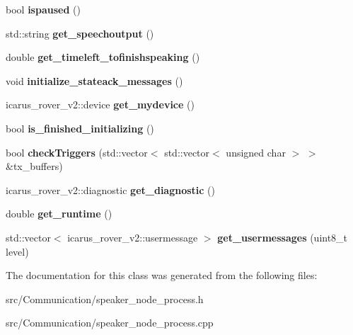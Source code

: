 \begin{DoxyCompactItemize}
\mbox{\label{classSpeakerNodeProcess_a5b25a7f361b6391dd4c01c525a307973}} 
bool {\bfseries ispaused} ()
\item 
\mbox{\label{classSpeakerNodeProcess_af3137548688050b0a4d1024e068014d5}} 
std\+::string {\bfseries get\+\_\+speechoutput} ()
\item 
\mbox{\label{classSpeakerNodeProcess_a9cc65b70bef3e3eb861dfc4c5c0b65e2}} 
double {\bfseries get\+\_\+timeleft\+\_\+tofinishspeaking} ()
\item 
\mbox{\label{classSpeakerNodeProcess_a2c925d463829344919dd8d2e94f34808}} 
void {\bfseries initialize\+\_\+stateack\+\_\+messages} ()
\item 
\mbox{\label{classSpeakerNodeProcess_a785a5fce57d8c978ab2bd196d003f57a}} 
icarus\+\_\+rover\+\_\+v2\+::device {\bfseries get\+\_\+mydevice} ()
\item 
\mbox{\label{classSpeakerNodeProcess_ae5246704ceab81c03a88b3630fbde9fc}} 
bool {\bfseries is\+\_\+finished\+\_\+initializing} ()
\item 
\mbox{\label{classSpeakerNodeProcess_ad1aede3b2dc4a1ea80f0339e6723cc54}} 
bool {\bfseries check\+Triggers} (std\+::vector$<$ std\+::vector$<$ unsigned char $>$ $>$ \&tx\+\_\+buffers)
\item 
\mbox{\label{classSpeakerNodeProcess_aeeb7d21efc59954ab8588957289de361}} 
icarus\+\_\+rover\+\_\+v2\+::diagnostic {\bfseries get\+\_\+diagnostic} ()
\item 
\mbox{\label{classSpeakerNodeProcess_a6bcd707115f5fb36ff273a0e35a52143}} 
double {\bfseries get\+\_\+runtime} ()
\item 
\mbox{\label{classSpeakerNodeProcess_aa8591cf842ec0cee93eb300f62d233a7}} 
std\+::vector$<$ icarus\+\_\+rover\+\_\+v2\+::usermessage $>$ {\bfseries get\+\_\+usermessages} (uint8\+\_\+t level)
\end{DoxyCompactItemize}


The documentation for this class was generated from the following files\+:\begin{DoxyCompactItemize}
\item 
src/\+Communication/speaker\+\_\+node\+\_\+process.\+h\item 
src/\+Communication/speaker\+\_\+node\+\_\+process.\+cpp\end{DoxyCompactItemize}
